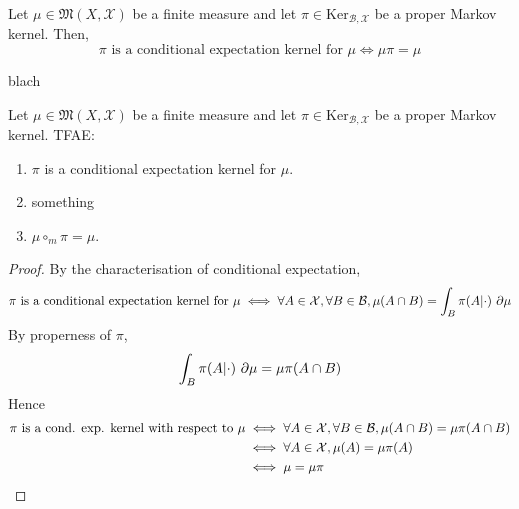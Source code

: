 \begin{lemma}
    \label{lem:cond-exp-ker-char}

    Let $\mu\in\mathfrak{M}(X,\mathcal{X})$ be a finite measure and let $\pi\in\text{Ker}_{\mathcal{B},\mathcal{X}}$ be a proper Markov kernel. Then,
    $$\pi \text{ is a conditional expectation kernel for }\mu \iff \mu\pi = \mu$$
\end{lemma}

\begin{lemma}
    \label{lem:cond-exp-ker-markov-char}
    \leanok

    blach
\end{lemma}

\begin{lemma}
    \label{lem:cond-exp-ker-proper-tfae}
    \leanok

    Let $\mu \in \mathfrak{M}(X, \mathcal X)$ be a finite measure and let $\pi\in\text{Ker}_{\mathcal{B},\mathcal{X}}$ be a proper Markov kernel. TFAE:
    \begin{enumerate}
        \item $\pi$ is a conditional expectation kernel for $\mu$.
        \item something
        \item $\mu\circ_m\pi=\mu$.
    \end{enumerate}
\end{lemma}
\begin{proof}
    \leanok

    By the characterisation of conditional expectation,
    $$\pi \text{ is a conditional expectation kernel for }\mu \iff \forall A \in \mathcal X, \forall B \in \mathcal B, \mu(A \cap B) = \int_B \pi(A|\cdot)\ \partial\mu$$
    By properness of $\pi$,
    $$\int_B \pi(A|\cdot)\ \partial\mu = \mu\pi(A \cap B)$$
    Hence
    \begin{align}
        \pi \text{ is a cond. exp. kernel with respect to }\mu
        & \iff \forall A \in \mathcal X, \forall B \in \mathcal B, \mu(A \cap B) = \mu\pi(A \cap B) \\
        & \iff \forall A \in \mathcal X, \mu(A) = \mu\pi(A) \\
        & \iff \mu = \mu\pi
    \end{align}
\end{proof}
